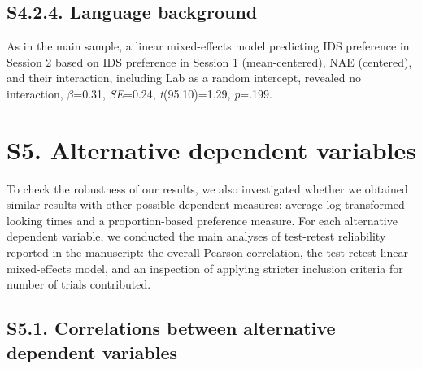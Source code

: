 \documentclass[
  english,
  man, donotrepeattitle,floatsintext]{apa6}
\begin{document}
\hypertarget{s4.2.4.-language-background}{%
\subsection{S4.2.4. Language background}\label{s4.2.4.-language-background}}

As in the main sample, a linear mixed-effects model predicting IDS preference in Session 2 based on IDS preference in Session 1 (mean-centered), NAE (centered), and their interaction, including Lab as a random intercept, revealed no interaction, \(\beta\)=0.31, \emph{SE}=0.24, \emph{t}(95.10)=1.29, \emph{p}=.199.

\newpage

\hypertarget{s5.-alternative-dependent-variables}{%
\section{S5. Alternative dependent variables}\label{s5.-alternative-dependent-variables}}

To check the robustness of our results, we also investigated whether we obtained similar results with other possible dependent measures: average log-transformed looking times and a proportion-based preference measure. For each alternative dependent variable, we conducted the main analyses of test-retest reliability reported in the manuscript: the overall Pearson correlation, the test-retest linear mixed-effects model, and an inspection of applying stricter inclusion criteria for number of trials contributed.

\hypertarget{s5.1.-correlations-between-alternative-dependent-variables}{%
\subsection{S5.1. Correlations between alternative dependent variables}\label{s5.1.-correlations-between-alternative-dependent-variables}}
\end{document}
